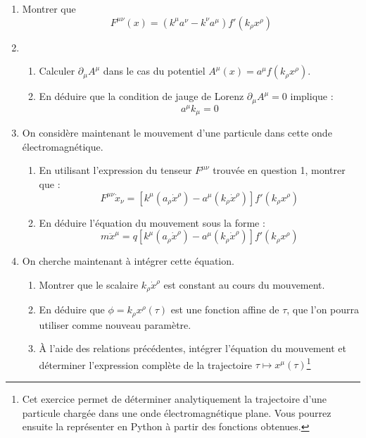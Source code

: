\documentclass[a4paper,10pt]{report}
\begin{document}
\begin{enumerate}
	\item Montrer que
	\[
	F^{\mu\nu}(x) = \left(k^\mu a^\nu - k^\nu a^\mu\right) f'(k_\rho x^\rho)
	\]
\item 
\begin{enumerate}
	\item Calculer $\partial_\mu A^\mu$ dans le cas du potentiel $A^\mu(x) = a^\mu f(k_\rho x^\rho)$.
	\item En déduire que la condition de jauge de Lorenz $\partial_\mu A^\mu = 0$ implique :
	\[
	a^\mu k_\mu = 0
	\]
\end{enumerate}


\item On considère maintenant le mouvement d'une particule dans cette onde électromagnétique.

\begin{enumerate}
	\item En utilisant l'expression du tenseur $F^{\mu\nu}$ trouvée en question 1, montrer que :
	\[
	F^{\mu\nu} \dot{x}_\nu = \left[k^\mu (a_\rho \dot{x}^\rho) - a^\mu (k_\rho \dot{x}^\rho)\right] f'(k_\rho x^\rho)
	\]
	\item En déduire l'équation du mouvement sous la forme :
	\[
	m \ddot{x}^\mu = q \left[k^\mu (a_\rho \dot{x}^\rho) - a^\mu (k_\rho \dot{x}^\rho)\right] f'(k_\rho x^\rho)
	\]
\end{enumerate}


\item On cherche maintenant à intégrer cette équation.

\begin{enumerate}
	\item Montrer que le scalaire $k_\rho \dot{x}^\rho$ est constant au cours du mouvement.
	\item En déduire que $\phi = k_\rho x^\rho(\tau)$ est une fonction affine de $\tau$, que l'on pourra utiliser comme nouveau paramètre.
	\item À l'aide des relations précédentes, intégrer l’équation du mouvement et déterminer l'expression complète de la trajectoire $\tau \mapsto x^\mu(\tau)$\footnote{Cet exercice permet de déterminer analytiquement la trajectoire d’une particule chargée dans une onde électromagnétique plane. Vous pourrez ensuite la représenter en Python à partir des fonctions obtenues.}
\end{enumerate}
\end{enumerate}
\end{document}
